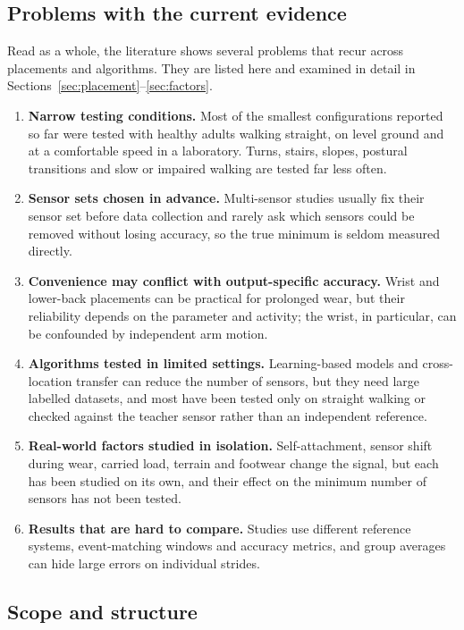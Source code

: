 \documentclass[10pt,a4paper,twocolumn]{article}
\begin{document}
\subsection{Problems with the current evidence}
\label{sec:problems}

Read as a whole, the literature shows several problems that recur across placements and algorithms. They are listed here and examined in detail in Sections~\ref{sec:placement}--\ref{sec:factors}.

\begin{enumerate}[label=\textbf{P\arabic*.}]
  \item \textbf{Narrow testing conditions.} Most of the smallest configurations reported so far were tested with healthy adults walking straight, on level ground and at a comfortable speed in a laboratory. Turns, stairs, slopes, postural transitions and slow or impaired walking are tested far less often.
  \item \textbf{Sensor sets chosen in advance.} Multi-sensor studies usually fix their sensor set before data collection and rarely ask which sensors could be removed without losing accuracy, so the true minimum is seldom measured directly.
    \item \textbf{Convenience may conflict with output-specific accuracy.} Wrist and lower-back placements can be practical for prolonged wear, but their reliability depends on the parameter and activity; the wrist, in particular, can be confounded by independent arm motion.
  \item \textbf{Algorithms tested in limited settings.} Learning-based models and cross-location transfer can reduce the number of sensors, but they need large labelled datasets, and most have been tested only on straight walking or checked against the teacher sensor rather than an independent reference.
  \item \textbf{Real-world factors studied in isolation.} Self-attachment, sensor shift during wear, carried load, terrain and footwear change the signal, but each has been studied on its own, and their effect on the minimum number of sensors has not been tested.
  \item \textbf{Results that are hard to compare.} Studies use different reference systems, event-matching windows and accuracy metrics, and group averages can hide large errors on individual strides.
\end{enumerate}

\subsection{Scope and structure}
\end{document}
